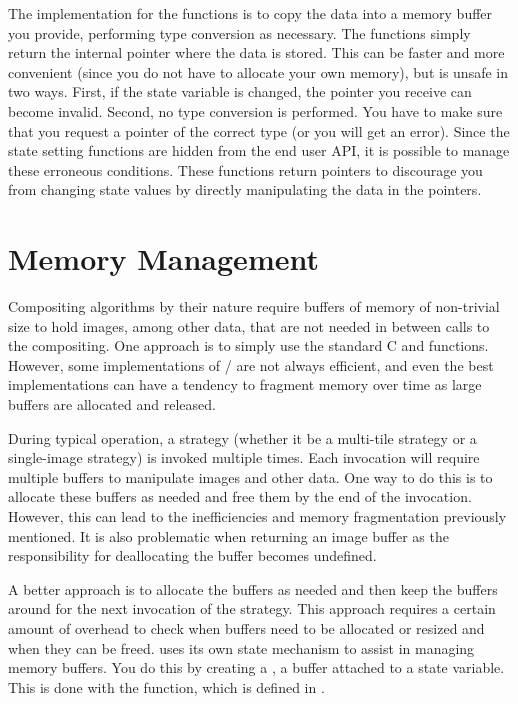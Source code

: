 The implementation for the  functions is to copy the data
into a memory buffer you provide, performing type conversion as necessary.
The  functions simply return the internal pointer
where the data is stored.  This can be faster and more convenient (since
you do not have to allocate your own memory), but is unsafe in two ways.
First, if the state variable is changed, the pointer you receive can become
invalid.  Second, no type conversion is performed.  You have to make sure
that you request a pointer of the correct type (or you will get an error).
Since the state setting functions are hidden from the end user API, it is
possible to manage these erroneous conditions.  These functions return
 pointers to discourage you from changing state values by
directly manipulating the data in the pointers.

\section{Memory Management}
\label{sec:New_Strategies:Memory_Management}

Compositing algorithms by their nature require buffers of memory of
non-trivial size to hold images, among other data, that are not needed in
between calls to the compositing.  One approach is to simply use the
standard C  and  functions.
However, some implementations of
/ are not always efficient, and
even the best implementations can have a tendency to fragment memory over
time as large buffers are allocated and released.

During typical \IceT operation, a strategy (whether it be a multi-tile
strategy or a single-image strategy) is invoked multiple times.  Each
invocation will require multiple buffers to manipulate images and other
data.  One way to do this is to allocate these buffers as needed and
free them by the end of the invocation.  However, this can lead to
the inefficiencies and memory fragmentation previously mentioned.  It is
also problematic when returning an image buffer as the responsibility for
deallocating the buffer becomes undefined.

A better approach is to allocate the buffers as needed and then keep the
buffers around for the next invocation of the strategy.  This approach
requires a certain amount of overhead to check when buffers need to be
allocated or resized and when they can be freed.  \IceT uses its own state
mechanism to assist in managing memory buffers.  You do this by creating a
, a buffer attached to a state
variable.  This is done with the  function, which
is defined in .

